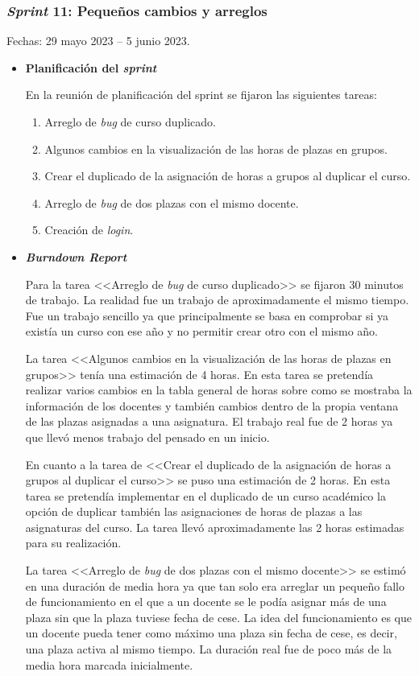 \subsubsection{\textit{Sprint} 11: Pequeños cambios y arreglos}
Fechas: 29 mayo 2023 -- 5 junio 2023.
\begin{itemize}
\item\textbf{Planificación del \textit{sprint}}

En la reunión de planificación del sprint se fijaron las siguientes tareas:
\begin{enumerate}
		\item Arreglo de \textit{bug} de curso duplicado.
		\item Algunos cambios en la visualización de las horas de plazas en grupos.
		\item Crear el duplicado de la asignación de horas a grupos al duplicar el curso.
		\item Arreglo de \textit{bug} de dos plazas con el mismo docente.
		\item Creación de \textit{login}.
\end{enumerate}

\item\textbf{\textit{Burndown Report}}

Para la tarea <<Arreglo de \textit{bug} de curso duplicado>> se fijaron 30 minutos de trabajo.
La realidad fue un trabajo de aproximadamente el mismo tiempo.
Fue un trabajo sencillo ya que principalmente se basa en comprobar si ya existía un curso con ese año y no permitir crear otro con el mismo año.

La tarea <<Algunos cambios en la visualización de las horas de plazas en grupos>> tenía una estimación de 4 horas.
En esta tarea se pretendía realizar varios cambios en la tabla general de horas sobre como se mostraba la información de los docentes y también cambios dentro de la propia ventana de las plazas asignadas a una asignatura.
El trabajo real fue de 2 horas ya que llevó menos trabajo del pensado en un inicio.

En cuanto a la tarea de <<Crear el duplicado de la asignación de horas a grupos al duplicar el curso>> se puso una estimación de 2 horas.
En esta tarea se pretendía implementar en el duplicado de un curso académico la opción de duplicar también las asignaciones de horas de plazas a las asignaturas del curso.
La tarea llevó aproximadamente las 2 horas estimadas para su realización.

La tarea <<Arreglo de \textit{bug} de dos plazas con el mismo docente>> se estimó en una duración de media hora ya que tan solo era arreglar un pequeño fallo de funcionamiento en el que a un docente se le podía asignar más de una plaza sin que la plaza tuviese fecha de cese.
La idea del funcionamiento es que un docente pueda tener como máximo una plaza sin fecha de cese, es decir, una plaza activa al mismo tiempo.
La duración real fue de poco más de la media hora marcada inicialmente.


\end{itemize}
